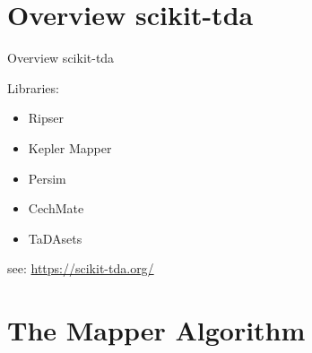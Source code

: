 \documentclass{beamer}
\begin{document}
\section{Overview scikit-tda}
\begin{frame}{Overview scikit-tda}

Libraries:
\begin{itemize}
	\item Ripser
	\item Kepler Mapper
	\item Persim
	\item CechMate
	\item TaDAsets
\end{itemize}

\vfill
see: \url{https://scikit-tda.org/}
\end{frame}






\section{The Mapper Algorithm}

\begin{frame}

\end{frame}
\end{document}
